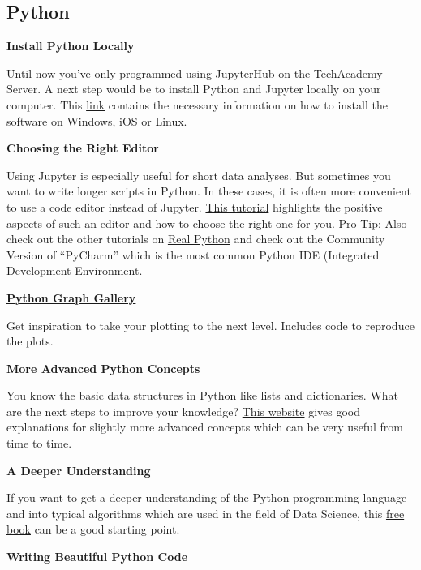 \documentclass[
  11pt,
]{article}
\newenvironment{tipsp}[1]
  {
  \begin{itemize}
  \footnotesize
  \renewcommand{\labelitemi}{
    \raisebox{-.7\height}[0pt][0pt]{
      {\setkeys{Gin}{width=3em,keepaspectratio}
        \texttt{[image: images/\#1.png]}}
    }
  }
  \setlength{\fboxsep}{1em}
  \begin{pbox}
  \item
  }
  {
  \end{pbox}
  \end{itemize}
  }
\begin{document}
\hypertarget{python}{%
\subsection{Python}\label{python}}

\begin{tipsp}p
\textbf{Install Python Locally}

Until now you've only programmed using JupyterHub on the TechAcademy Server. A next step would be to install Python and Jupyter locally on your computer. This \href{https://docs.anaconda.com/anaconda/install/}{link} contains the necessary information on how to install the software on Windows, iOS or Linux.

\textbf{Choosing the Right Editor}

Using Jupyter is especially useful for short data analyses. But sometimes you want to write longer scripts in Python. In these cases, it is often more convenient to use a code editor instead of Jupyter. \href{https://realpython.com/learning-paths/perfect-your-python-development-setup/}{This tutorial} highlights the positive aspects of such an editor and how to choose the right one for you. Pro-Tip: Also check out the other tutorials on \href{https://realpython.com/}{Real Python} and check out the Community Version of ``PyCharm'' which is the most common Python IDE (Integrated Development Environment.

\textbf{\href{https://python-graph-gallery.com/}{Python Graph Gallery}}

Get inspiration to take your plotting to the next level. Includes code to reproduce the plots.

\textbf{More Advanced Python Concepts}

You know the basic data structures in Python like lists and dictionaries. What are the next steps to improve your knowledge? \href{https://book.pythontips.com/en/latest/index.html}{This website} gives good explanations for slightly more advanced concepts which can be very useful from time to time.

\textbf{A Deeper Understanding}

If you want to get a deeper understanding of the Python programming language and into typical algorithms which are used in the field of Data Science, this \href{https://github.com/ab-anand/py-books/blob/master/Data\%20Science\%20from\%20Scratch-\%20First\%20Principles\%20with\%20Python.pdf}{free book} can be a good starting point.

\textbf{Writing Beautiful Python Code}


\end{tipsp}
\end{document}
